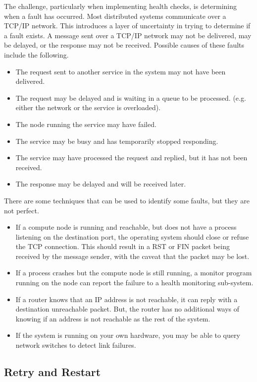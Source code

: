 The challenge, particularly when implementing health checks, is determining when a fault has occurred.
Most distributed systems communicate over a TCP/IP network.
This introduces a layer of uncertainty in trying to determine if a fault exists.
A message sent over a TCP/IP network may not be delivered, may be delayed, or the response may not be received.
Possible causes of these faults include the following.
\begin{itemize}
    \item The request sent to another service in the system may not have been delivered.
    \item The request may be delayed and is waiting in a queue to be processed. (e.g. either the network or the service is overloaded).
    \item The node running the service may have failed.
    \item The service may be busy and has temporarily stopped responding.
    \item The service may have processed the request and replied, but it has not been received.
    \item The response may be delayed and will be received later.
\end{itemize}

\noindent
There are some techniques that can be used to identify some faults, but they are not perfect.
\begin{itemize}
    \item If a compute node is running and reachable, but does not have a process listening on the destination port, the operating system should close or refuse the TCP connection. This should result in a RST or FIN packet being received by the message sender, with the caveat that the packet may be lost.
    \item If a process crashes but the compute node is still running, a monitor program running on the node can report the failure to a health monitoring sub-system.
    \item If a router knows that an IP address is not reachable, it can reply with a destination unreachable packet. But, the router has no additional ways of knowing if an address is not reachable as the rest of the system.
    \item If the system is running on your own hardware, you may be able to query network switches to detect link failures.
\end{itemize}

\subsection{Retry and Restart}

